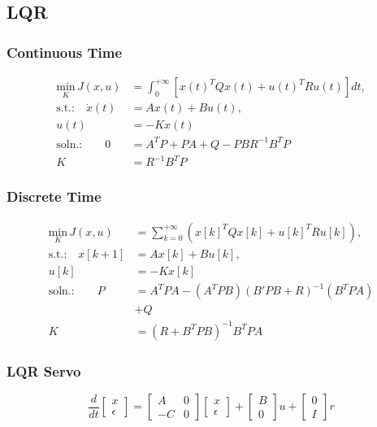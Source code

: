 \subsection{LQR}
\subsubsection{Continuous Time}
    \vspace*{-0.4em}
    \begin{align*}
        \underset{K}{\text{min}} \, J(x,u) &= \int_{0}^{+\infty}[x(t)^TQx(t) + u(t)^TRu(t)]dt,\\[5pt]
        \text{s.t.:} \quad \dot{x}(t) &= Ax(t) + Bu(t),\\
        u(t) &= -Kx(t)\\[5pt]
        \text{soln.:} \qquad 0 &= A^TP + PA + Q - PBR^{-1}B^TP\\
        K &= R^{-1}B^TP
    \end{align*}

\subsubsection{Discrete Time}
    \vspace*{-0.4em}
    \begin{align*}
        \underset{K}{\text{min}} \, J(x,u) &= \sum_{k=0}^{+\infty}(x[k]^TQx[k] + u[k]^TRu[k]),\\[5pt]
        \text{s.t.:} \quad x[k+1] &= Ax[k] + Bu[k],\\
        u[k] &= -Kx[k]\\[5pt]
        \text{soln.:} \qquad P &= A^TPA - (A^TPB)(B'PB+R)^{-1}(B^TPA)\\
        &+Q\\
        K &= (R+B^TPB)^{-1}B^TPA
    \end{align*}

\subsubsection{LQR Servo}
    $$
    \frac{d}{dt} \begin{bmatrix} x \\ \epsilon \end{bmatrix} 
    = \begin{bmatrix} A & 0 \\ -C & 0 \end{bmatrix} \begin{bmatrix} x \\ \epsilon \end{bmatrix}
    + \begin{bmatrix} B \\ 0 \end{bmatrix} u + \begin{bmatrix} 0 \\ I \end{bmatrix} r
    $$